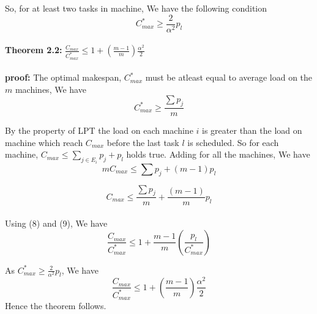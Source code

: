 \documentclass[10pt, conference, compsocconf]{IEEEtran}
\begin{document}
So, for at least two tasks in machine, We have the following condition\\
\begin{equation}
C_{max}^{*} \geq {\frac{2}{\alpha^{2}}} p_l 
\end{equation}
\\
\textbf{Theorem 2.2:} $\frac{C_{max}}{C_{max}^{*}} \leq 1 + (\frac{m-1}{m})\frac{\alpha^{2}}{2}$\\
\\
\textbf{proof:} The optimal makespan, $C_{max}^{*}$ must be atleast equal to average load on the $m$ machines, We have\\
\begin{equation}
C_{max}^{*}\geq\frac{\sum p_j}{m}
\end{equation}

By the property of LPT the load on each machine $i$ is greater than the load on machine which reach $C_{max}$ before the last task $l$ is scheduled. So for each machine, $C_{max} \leq  \sum_{j \in E_i}^{}{p_j} + p_l$ holds true.  Adding for all the machines, We have\\

\begin{equation}\nonumber 
mC_{max} \leq  \sum {p_j} + (m-1)p_l
\end{equation}

\begin{equation}
C_{max} \leq  \frac{\sum {p_j}}{m} + \frac{(m-1)}{m}p_l
\end{equation}
\\
Using (8) and (9), We have\\

\begin{equation}\nonumber
\frac{C_{max}}{C_{max}^{*}} \leq 1 + {\frac{m-1}{m}}(\frac{p_l}{C_{max}^{*}})
\end{equation}

As $C_{max}^{*} \geq {\frac{2}{\alpha^{2}}} p_l $, We have \\

\begin{equation}\nonumber
\frac{C_{max}}{C_{max}^{*}} \leq 1 + (\frac{m-1}{m})\frac{\alpha^{2}}{2}
\end{equation}
Hence the theorem follows.   \\                            
\end{document}
